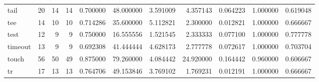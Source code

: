\begin{longtable}{lrrrrrrrrrr}
tail      &                                      20 &                 14 &                                14 &                                   0.700000 &                              48.000000 &                                     3.591009 &                          4.357143 &                                0.064223 &                           1.000000 &                                           0.619048 \\
tee       &                                      14 &                 10 &                                10 &                                   0.714286 &                              35.600000 &                                     5.112821 &                          2.300000 &                                0.012821 &                           1.000000 &                                           0.666667 \\
test      &                                      12 &                  9 &                                 9 &                                   0.750000 &                              16.555556 &                                     1.521545 &                          2.333333 &                                0.077100 &                           1.000000 &                                           0.777778 \\
timeout   &                                      13 &                  9 &                                 9 &                                   0.692308 &                              41.444444 &                                     4.628173 &                          2.777778 &                                0.072617 &                           1.000000 &                                           0.703704 \\
touch     &                                      56 &                 50 &                                49 &                                   0.875000 &                              79.260000 &                                     4.084442 &                         24.920000 &                                0.164442 &                           0.960000 &                                           0.606667 \\
tr        &                                      17 &                 13 &                                13 &                                   0.764706 &                              49.153846 &                                     3.769102 &                          1.769231 &                                0.012191 &                           1.000000 &                                           0.666667 \\

\end{longtable}
